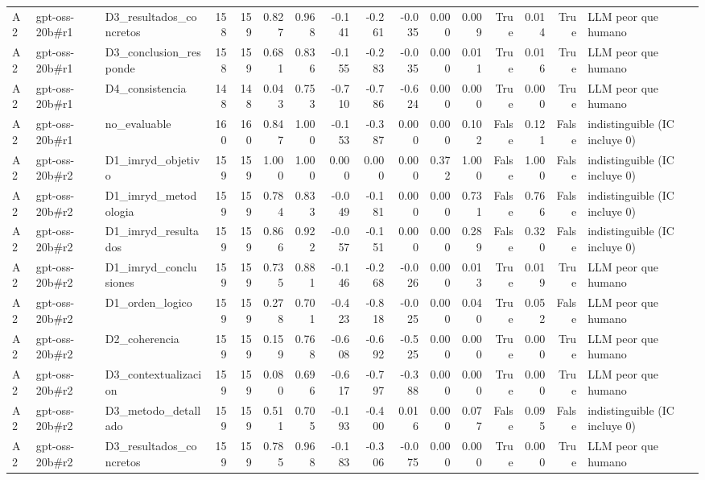 \begin{table}
{\begin{tabular}{lllrrrrrrrrrrrrl}
A2 & gpt-oss-20b\#r1 & D3\_resultados\_concretos & 158 & 159 & 0.827 & 0.968 & -0.141 & -0.261 & -0.035 & 0.000 & 0.009 & True & 0.014 & True & LLM peor que humano \\
A2 & gpt-oss-20b\#r1 & D3\_conclusion\_responde & 158 & 159 & 0.681 & 0.836 & -0.155 & -0.283 & -0.035 & 0.000 & 0.011 & True & 0.016 & True & LLM peor que humano \\
A2 & gpt-oss-20b\#r1 & D4\_consistencia & 148 & 148 & 0.043 & 0.753 & -0.710 & -0.786 & -0.624 & 0.000 & 0.000 & True & 0.000 & True & LLM peor que humano \\
A2 & gpt-oss-20b\#r1 & no\_evaluable & 160 & 160 & 0.847 & 1.000 & -0.153 & -0.387 & 0.000 & 0.000 & 0.102 & False & 0.121 & False & indistinguible (IC incluye 0) \\
A2 & gpt-oss-20b\#r2 & D1\_imryd\_objetivo & 159 & 159 & 1.000 & 1.000 & 0.000 & 0.000 & 0.000 & 0.372 & 1.000 & False & 1.000 & False & indistinguible (IC incluye 0) \\
A2 & gpt-oss-20b\#r2 & D1\_imryd\_metodologia & 159 & 159 & 0.784 & 0.833 & -0.049 & -0.181 & 0.000 & 0.000 & 0.731 & False & 0.766 & False & indistinguible (IC incluye 0) \\
A2 & gpt-oss-20b\#r2 & D1\_imryd\_resultados & 159 & 159 & 0.866 & 0.922 & -0.057 & -0.151 & 0.000 & 0.000 & 0.289 & False & 0.320 & False & indistinguible (IC incluye 0) \\
A2 & gpt-oss-20b\#r2 & D1\_imryd\_conclusiones & 159 & 159 & 0.735 & 0.881 & -0.146 & -0.268 & -0.026 & 0.000 & 0.013 & True & 0.019 & True & LLM peor que humano \\
A2 & gpt-oss-20b\#r2 & D1\_orden\_logico & 159 & 159 & 0.278 & 0.701 & -0.423 & -0.818 & -0.025 & 0.000 & 0.040 & True & 0.052 & False & LLM peor que humano \\
A2 & gpt-oss-20b\#r2 & D2\_coherencia & 159 & 159 & 0.159 & 0.768 & -0.608 & -0.692 & -0.525 & 0.000 & 0.000 & True & 0.000 & True & LLM peor que humano \\
A2 & gpt-oss-20b\#r2 & D3\_contextualizacion & 159 & 159 & 0.080 & 0.696 & -0.617 & -0.797 & -0.388 & 0.000 & 0.000 & True & 0.000 & True & LLM peor que humano \\
A2 & gpt-oss-20b\#r2 & D3\_metodo\_detallado & 159 & 159 & 0.511 & 0.705 & -0.193 & -0.400 & 0.016 & 0.000 & 0.077 & False & 0.095 & False & indistinguible (IC incluye 0) \\
A2 & gpt-oss-20b\#r2 & D3\_resultados\_concretos & 159 & 159 & 0.785 & 0.968 & -0.183 & -0.306 & -0.075 & 0.000 & 0.000 & True & 0.000 & True & LLM peor que humano \\

\end{tabular}}
\end{table}
